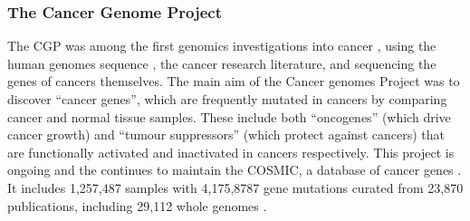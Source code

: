 \subsubsection{The Cancer Genome Project}
The \gls{CGP} %
was among the first \glspl{genomic} investigations into cancer \citep{Dickson1999}, using the human \glspl{genome} sequence \citep{Lander2001, Collins2007}, the cancer research literature, and sequencing the genes of cancers themselves. 
The main aim of the Cancer \Glspl{genome} Project was to discover ``\glspl{cancer gene}'', which are frequently mutated in cancers by comparing cancer and normal tissue samples. These include both ``\glspl{oncogene}'' (which drive  cancer growth) and ``\glspl{tumour suppressor}'' (which protect against cancers) that are functionally activated and inactivated in cancers respectively. This project is ongoing and the continues to %
%
maintain the \gls{COSMIC}, a database of \glspl{cancer gene} \citep{COSMICdb}. %
It includes 1,257,487 samples with 4,175,8787 gene \glspl{mutation} curated from 23,870 publications, including 29,112 whole \glspl{genome} \citep{COSMICdb}.

